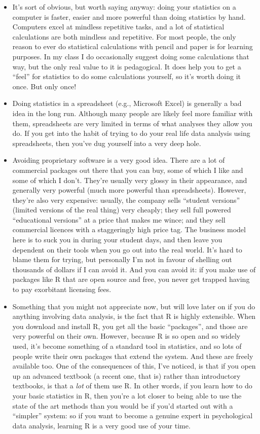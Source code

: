 \documentclass[
]{book}
\providecommand{\tightlist}{%
  \setlength{\itemsep}{0pt}\setlength{\parskip}{0pt}}
\begin{document}
\begin{itemize}
\tightlist
\item
  It's sort of obvious, but worth saying anyway: doing your statistics on a computer is faster, easier and more powerful than doing statistics by hand. Computers excel at mindless repetitive tasks, and a lot of statistical calculations are both mindless and repetitive. For most people, the only reason to ever do statistical calculations with pencil and paper is for learning purposes. In my class I do occasionally suggest doing some calculations that way, but the only real value to it is pedagogical. It does help you to get a ``feel'' for statistics to do some calculations yourself, so it's worth doing it once. But only once!
\item
  Doing statistics in a spreadsheet (e.g., Microsoft Excel) is generally a bad idea in the long run. Although many people are likely feel more familiar with them, spreadsheets are very limited in terms of what analyses they allow you do. If you get into the habit of trying to do your real life data analysis using spreadsheets, then you've dug yourself into a very deep hole.
\item
  Avoiding proprietary software is a very good idea. There are a lot of commercial packages out there that you can buy, some of which I like and some of which I don't. They're usually very glossy in their appearance, and generally very powerful (much more powerful than spreadsheets). However, they're also very expensive: usually, the company sells ``student versions'' (limited versions of the real thing) very cheaply; they sell full powered ``educational versions'' at a price that makes me wince; and they sell commercial licences with a staggeringly high price tag. The business model here is to suck you in during your student days, and then leave you dependent on their tools when you go out into the real world. It's hard to blame them for trying, but personally I'm not in favour of shelling out thousands of dollars if I can avoid it. And you can avoid it: if you make use of packages like R that are open source and free, you never get trapped having to pay exorbitant licensing fees.
\item
  Something that you might not appreciate now, but will love later on if you do anything involving data analysis, is the fact that R is highly extensible. When you download and install R, you get all the basic ``packages'', and those are very powerful on their own. However, because R is so open and so widely used, it's become something of a standard tool in statistics, and so lots of people write their own packages that extend the system. And these are freely available too. One of the consequences of this, I've noticed, is that if you open up an advanced textbook (a recent one, that is) rather than introductory textbooks, is that a \emph{lot} of them use R. In other words, if you learn how to do your basic statistics in R, then you're a lot closer to being able to use the state of the art methods than you would be if you'd started out with a ``simpler'' system: so if you want to become a genuine expert in psychological data analysis, learning R is a very good use of your time.

\end{itemize}
\end{document}

